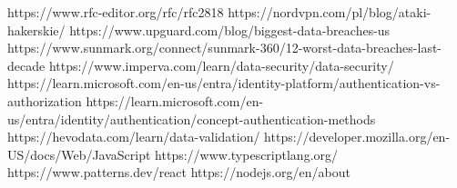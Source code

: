 \documentclass[12pt,twoside]{article}
\begin{document}

\begin{thebibliography}{4}
     https://www.rfc-editor.org/rfc/rfc2818
     https://nordvpn.com/pl/blog/ataki-hakerskie/
     https://www.upguard.com/blog/biggest-data-breaches-us
     https://www.sunmark.org/connect/sunmark-360/12-worst-data-breaches-last-decade
     https://www.imperva.com/learn/data-security/data-security/
     https://learn.microsoft.com/en-us/entra/identity-platform/authentication-vs-authorization
     https://learn.microsoft.com/en-us/entra/identity/authentication/concept-authentication-methods
     https://hevodata.com/learn/data-validation/
     https://developer.mozilla.org/en-US/docs/Web/JavaScript
     https://www.typescriptlang.org/
     https://www.patterns.dev/react
     https://nodejs.org/en/about


\end{thebibliography}

\clearpage

\makesummary
\end{document}
